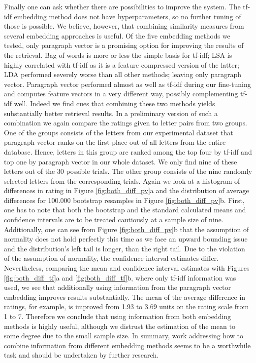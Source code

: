 Finally one can ask whether there are possibilities to improve the system. The tf-idf embedding method does not have hyperparameters, so no further tuning of those is possible. We believe, however, that combining similarity measures from several embedding approaches is useful. Of the five embedding methods we tested, only paragraph vector is a promising option for improving the results of the retrieval. Bag of words is more or less the simple basis for tf-idf; LSA is highly correlated with tf-idf as it is a feature compressed version of the latter; LDA performed severely worse than all other methods; leaving only paragraph vector. Paragraph vector performed almost as well as tf-idf during our fine-tuning and computes feature vectors in a very different way, possibly complementing tf-idf well. Indeed we find cues that combining these two methods yields substantially better retrieval results. In a preliminary version of such a combination we again compare the ratings given to letter pairs from two groups. One of the groups consists of the letters from our experimental dataset that paragraph vector ranks on the first place out of all letters from the entire database. Hence, letters in this group are ranked among the top four by tf-idf and top one by paragraph vector in our whole dataset. We only find nine of these letters out of the 30 possible trials. The other group consists of the nine randomly selected letters from the corresponding trials. Again we look at a histogram of differences in rating in Figure \ref{fig:both_diff_pv}a and the distribution of average differences for 100.000 bootstrap resamples in Figure \ref{fig:both_diff_pv}b. First, one has to note that both the bootstrap and the standard calculated means and confidence intervals are to be treated cautiously at a sample size of nine. Additionally, one can see from Figure \ref{fig:both_diff_pv}b that the assumption of normality does not hold perfectly this time as we face an upward bounding issue and the distribution's left tail is longer, than the right tail. Due to the violation of the assumption of normality, the confidence interval estimates differ. Nevertheless, comparing the mean and confidence interval estimates with Figures \ref{fig:both_diff_tf}a and \ref{fig:both_diff_tf}b, where only tf-idf information was used, we see that additionally using information from the paragraph vector embedding improves results substantially. The mean of the average difference in ratings, for example, is improved from 1.93 to 3.69 units on the rating scale from 1 to 7. Therefore we conclude that using information from both embedding methods is highly useful, although we distrust the estimation of the mean to some degree due to the small sample size. In summary, work addressing how to combine information from different embedding methods seems to be a worthwhile task and should be undertaken by further research.
